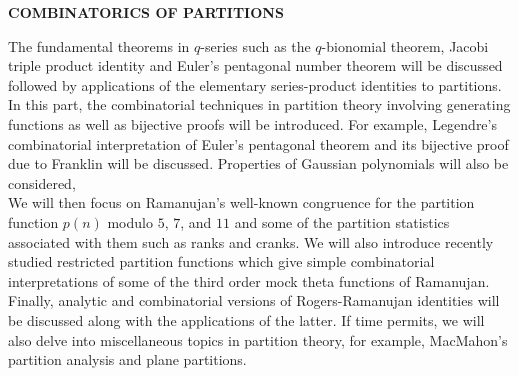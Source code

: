 \documentclass[a4paper, 12pt]{article}
\begin{document}
\begin{center}
	{\large\bf COMBINATORICS OF PARTITIONS}
\end{center}
	
The fundamental theorems in $q$-series such as the $q$-bionomial theorem, Jacobi triple product identity and Euler’s pentagonal number theorem will be discussed followed by applications of the elementary series-product identities to partitions. In this part, the combinatorial techniques in partition theory involving generating functions as well as bijective proofs will be introduced. For example, Legendre's combinatorial interpretation of Euler's pentagonal theorem and its bijective proof due to Franklin will be discussed. Properties of Gaussian polynomials will also be considered,\\

We will then focus on Ramanujan's well-known congruence for the partition function $p(n)$ modulo $5$, $7$, and $11$ and some of the partition statistics associated with them such as ranks and cranks. We will also introduce recently studied restricted partition functions which give simple combinatorial interpretations of some of the third order mock theta functions of Ramanujan.\\

Finally, analytic and combinatorial versions of Rogers-Ramanujan identities will be discussed along with the applications of the latter. If time permits, we will also delve into miscellaneous topics in partition theory, for example, MacMahon's partition analysis and plane partitions.
\end{document}
